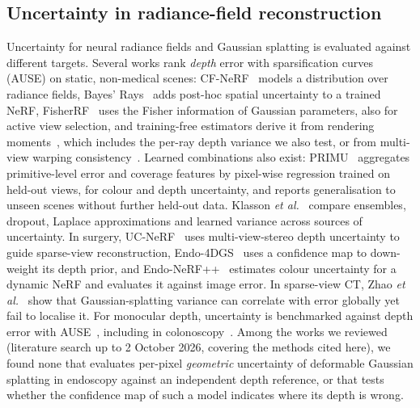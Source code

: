 
\subsection{Uncertainty in radiance-field reconstruction}
\label{sec:related_unc}
Uncertainty for neural radiance fields and Gaussian splatting is evaluated against different targets. Several works rank \emph{depth} error with sparsification curves (AUSE) on static, non-medical scenes: CF-NeRF~\cite{shen2022cfnerf} models a distribution over radiance fields, Bayes' Rays~\cite{goli2023bayesrays} adds post-hoc spatial uncertainty to a trained NeRF, FisherRF~\cite{jiang2023fisherrf} uses the Fisher information of Gaussian parameters, also for active view selection, and training-free estimators derive it from rendering moments~\cite{ewen2025moments}, which includes the per-ray depth variance we also test, or from multi-view warping consistency~\cite{safadoust2025warprf}. Learned combinations also exist: PRIMU~\cite{gottwald2025primu} aggregates primitive-level error and coverage features by pixel-wise regression trained on held-out views, for colour and depth uncertainty, and reports generalisation to unseen scenes without further held-out data. Klasson \emph{et al.}~\cite{klasson2024sources} compare ensembles, dropout, Laplace approximations and learned variance across sources of uncertainty. In surgery, UC-NeRF~\cite{guo2024ucnerf} uses multi-view-stereo depth uncertainty to guide sparse-view reconstruction, Endo-4DGS~\cite{huang2024endo4dgs} uses a confidence map to down-weight its depth prior, and Endo-NeRF++~\cite{habib2026endonerfpp} estimates colour uncertainty for a dynamic NeRF and evaluates it against image error. In sparse-view CT, Zhao \emph{et al.}~\cite{zhao2026variance} show that Gaussian-splatting variance can correlate with error globally yet fail to localise it. For monocular depth, uncertainty is benchmarked against depth error with AUSE~\cite{poggi2020uncertainty}, including in colonoscopy~\cite{rodriguez2021colonoscopy}. Among the works we reviewed (literature search up to 2 October 2026, covering the methods cited here), we found none that evaluates per-pixel \emph{geometric} uncertainty of deformable Gaussian splatting in endoscopy against an independent depth reference, or that tests whether the confidence map of such a model indicates where its depth is wrong.
